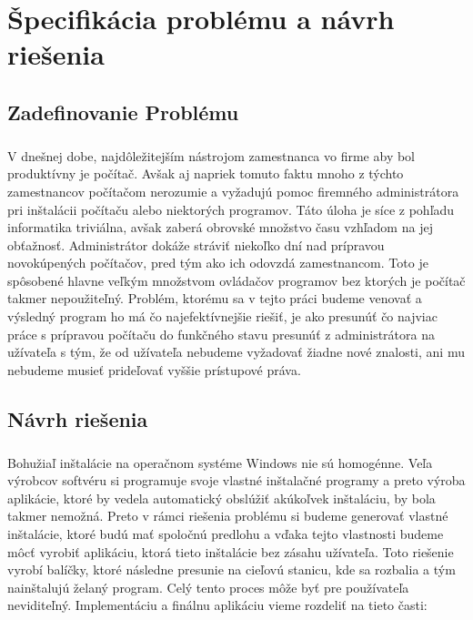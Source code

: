 \chapter{Špecifikácia problému a návrh riešenia}

\section{Zadefinovanie Problému}

\paragraph{}
V dnešnej dobe, najdôležitejším nástrojom  zamestnanca vo firme aby bol produktívny je počítač. Avšak aj napriek tomuto faktu mnoho z týchto zamestnancov počítačom nerozumie a vyžadujú pomoc firemného administrátora pri inštalácii počítaču alebo niektorých programov. Táto úloha je síce z pohľadu informatika triviálna, avšak zaberá obrovské množstvo času vzhľadom na jej obťažnosť. Administrátor dokáže stráviť niekoľko dní nad prípravou novokúpených  počítačov, pred tým ako ich odovzdá zamestnancom. Toto je spôsobené hlavne veľkým množstvom ovládačov programov bez ktorých je počítač takmer nepoužiteľný. 
Problém, ktorému sa v tejto práci budeme venovať a výsledný program ho má čo najefektívnejšie riešiť, je ako presunúť čo najviac práce s prípravou počítaču do funkčného stavu presunúť z administrátora na užívateľa s tým, že od užívateľa nebudeme vyžadovať žiadne nové znalosti, ani mu nebudeme musieť prideľovať vyššie prístupové práva.

\section{Návrh riešenia}

\paragraph{}
Bohužiaľ inštalácie na operačnom systéme Windows nie sú homogénne. Veľa výrobcov softvéru si programuje svoje vlastné inštalačné programy a preto výroba aplikácie, ktoré by vedela automatický obslúžiť akúkoľvek inštaláciu, by bola takmer nemožná. Preto v rámci riešenia problému si budeme generovať vlastné inštalácie, ktoré budú mať spoločnú predlohu a vďaka tejto vlastnosti budeme môcť vyrobiť aplikáciu, ktorá tieto inštalácie bez zásahu užívateľa.  Toto riešenie vyrobí balíčky, ktoré následne presunie na cieľovú stanicu, kde sa rozbalia a tým nainštalujú želaný program. Celý tento proces môže byť pre používateľa neviditeľný.  Implementáciu a finálnu aplikáciu vieme rozdeliť na tieto časti:


